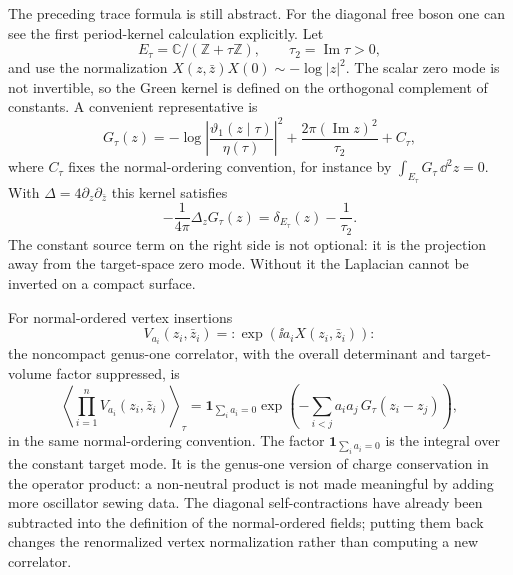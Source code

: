 \begin{example}
\label{ex:torus-free-boson-green-kernel}
The preceding trace formula is still abstract.  For the diagonal free boson one
can see the first period-kernel calculation explicitly.  Let
\[
  E_\tau=\mathbb C/(\mathbb Z+\tau\mathbb Z),\qquad
  \tau_2=\operatorname{Im}\tau>0,
\]
and use the normalization
\(X(z,\bar z)X(0)\sim-\log |z|^2\).  The scalar zero mode is not invertible, so
the Green kernel is defined on the orthogonal complement of constants.  A
convenient representative is
\begin{equation}
  G_\tau(z)
  =
  -\log\left|
    \frac{\vartheta_1(z\mid\tau)}{\eta(\tau)}
  \right|^2
  +\frac{2\pi(\operatorname{Im}z)^2}{\tau_2}
  +C_\tau ,
  \label{eq:torus-free-boson-green-kernel}
\end{equation}
where \(C_\tau\) fixes the normal-ordering convention, for instance by
\(\int_{E_\tau}G_\tau\,\dd^2z=0\).  With
\(\Delta=4\partial_z\partial_{\bar z}\) this kernel satisfies
\begin{equation}
  -\frac1{4\pi}\Delta_zG_\tau(z)
  =
  \delta_{E_\tau}(z)-\frac1{\tau_2}.
  \label{eq:torus-green-zero-mode-subtraction}
\end{equation}
The constant source term on the right side is not optional: it is the projection
away from the target-space zero mode.  Without it the Laplacian cannot be
inverted on a compact surface.

For normal-ordered vertex insertions
\[
  V_{a_i}(z_i,\bar z_i)=:\!\exp(\ii a_iX(z_i,\bar z_i))\!:
\]
the noncompact genus-one correlator, with the overall determinant and
target-volume factor suppressed, is
\begin{equation}
  \left\langle\prod_{i=1}^n V_{a_i}(z_i,\bar z_i)\right\rangle_\tau
  =
  \mathbf 1_{\sum_i a_i=0}
  \exp\!\left(
    -\sum_{i<j}a_ia_j\,G_\tau(z_i-z_j)
  \right),
  \label{eq:torus-free-boson-vertex-correlator}
\end{equation}
in the same normal-ordering convention.  The factor
\(\mathbf 1_{\sum_i a_i=0}\) is the integral over the constant target mode.  It
is the genus-one version of charge conservation in the operator product: a
non-neutral product is not made meaningful by adding more oscillator sewing
data.  The diagonal self-contractions have already been subtracted into the
definition of the normal-ordered fields; putting them back changes the
renormalized vertex normalization rather than computing a new correlator.


\end{example}
